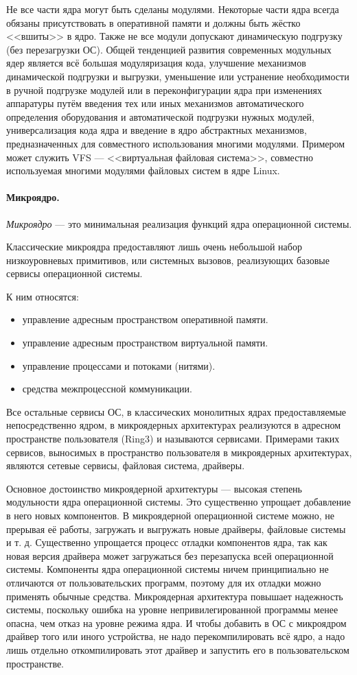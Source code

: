 Не все части ядра могут быть сделаны модулями. Некоторые части ядра всегда обязаны присутствовать в оперативной памяти и должны быть жёстко <<вшиты>> в ядро. Также не все модули допускают динамическую подгрузку (без перезагрузки ОС). Общей тенденцией развития современных модульных ядер является всё большая модуляризация кода, улучшение механизмов динамической подгрузки и выгрузки, уменьшение или устранение необходимости в ручной подгрузке модулей или в переконфигурации ядра при изменениях аппаратуры путём введения тех или иных механизмов автоматического определения оборудования и автоматической подгрузки нужных модулей, универсализация кода ядра и введение в ядро абстрактных механизмов, предназначенных для совместного использования многими модулями. Примером может служить VFS --- <<виртуальная файловая система>>, совместно используемая многими модулями файловых систем в ядре Linux.

\paragraph{Микроядро.} \emph{Микроядро} --- это минимальная реализация функций ядра операционной системы.

Классические микроядра предоставляют лишь очень небольшой набор низкоуровневых примитивов, или системных вызовов, реализующих базовые сервисы операционной системы.

К ним относятся:
\begin{itemize}
 \item управление адресным пространством оперативной памяти.
 \item управление адресным пространством виртуальной памяти.
 \item управление процессами и потоками (нитями).
 \item средства межпроцессной коммуникации.
\end{itemize}

Все остальные сервисы ОС, в классических монолитных ядрах предоставляемые непосредственно ядром, в микроядерных архитектурах реализуются в адресном пространстве пользователя (Ring3) и называются сервисами. Примерами таких сервисов, выносимых в пространство пользователя в микроядерных архитектурах, являются сетевые сервисы, файловая система, драйверы.

Основное достоинство микроядерной архитектуры --- высокая степень модульности ядра операционной системы. Это существенно упрощает добавление в него новых компонентов. В микроядерной операционной системе можно, не прерывая её работы, загружать и выгружать новые драйверы, файловые системы и т. д. Существенно упрощается процесс отладки компонентов ядра, так как новая версия драйвера может загружаться без перезапуска всей операционной системы. Компоненты ядра операционной системы ничем принципиально не отличаются от пользовательских программ, поэтому для их отладки можно применять обычные средства. Микроядерная архитектура повышает надежность системы, поскольку ошибка на уровне непривилегированной программы менее опасна, чем отказ на уровне режима ядра. И чтобы добавить в ОС с микроядром драйвер того или иного устройства, не надо перекомпилировать всё ядро, а надо лишь отдельно откомпилировать этот драйвер и запустить его в пользовательском пространстве.


